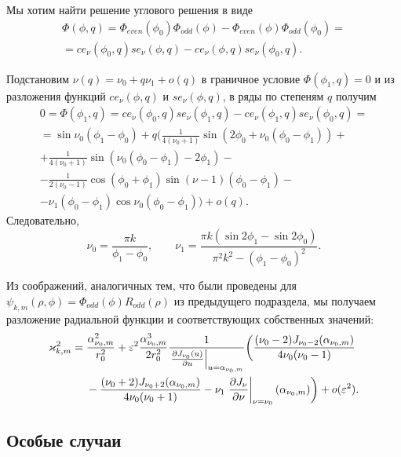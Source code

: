 Мы хотим найти решение углового решения в виде
\begin{multline*}
\Phi(\phi, q) = \Phi_{even}(\phi_0) \Phi_{odd}(\phi) - \Phi_{even}(\phi) \Phi_{odd}(\phi_0)  = \\
=ce_\nu(\phi_0, q) se_\nu(\phi, q) - ce_\nu(\phi, q) se_\nu(\phi_0, q).
\end{multline*}

 
Подстановим $\nu(q) = \nu_0 + q \nu_1 + o(q)$
в граничное условие  $\Phi(\phi_1, q) = 0$
и из разложения функций $ce_\nu(\phi, q)$ и $se_\nu(\phi, q)$, в ряды по степеням  $q$
 получим
\begin{multline*}
0=\Phi(\phi_1, q) = ce_\nu(\phi_0, q) se_\nu(\phi_1, q) -ce_\nu(\phi_1, q) se_\nu(\phi_0, q) = \\
= \sin \nu_0 (\phi_1 - \phi_0) +q \biggl(
\frac{1}{4(\nu_0+1)}  \sin{(2 \phi_0 + \nu_0(\phi_0-\phi_1))}+  \\
+\frac{1}{4(\nu_0+1)} \sin{(\nu_0(\phi_0-\phi_1)-2\phi_1)} - \\
-\frac{1}{2(\nu_0-1)}\cos{(\phi_0 + \phi_1)}\sin{(\nu-1)(\phi_0-\phi_1)} -\\
- \nu_1 (\phi_0 - \phi_1) \cos{\nu_0(\phi_0-\phi_1)} \biggr) + o(q).
\end{multline*}
Следовательно, 
\begin{equation*}
    \nu_0 = \frac{\pi k}{\phi_1-\phi_0}, \qquad \nu_1 = \frac{\pi k (\sin 2\phi_1 - \sin 2 \phi_0)}{\pi^2k^2-(\phi_1-\phi_0)^2}.
\end{equation*}

Из соображений, аналогичных тем, что были проведены для  $\psi_{k, m}(\rho, \phi) = \Phi_{odd}(\phi) R_{odd}(\rho)$ из предыдущего подраздела,
мы получаем разложение радиальной функции и соответствующих собственных значений:
\begin{align*}
    \varkappa_{k, m}^2 ={}& \frac{\alpha_{\nu_0, m}^2}{r_0^2} +  \varepsilon^2 \frac{\alpha_{\nu_0, m}^3}{2 r_0^2}\frac{1}{ \left.\frac{\partial J_{\nu_0}(u)}{\partial u}\right|_{u=\alpha_{\nu_0, m}} }\biggl(\frac{(\nu_0 - 2)J_{\nu_0-2}(\alpha_{\nu_0, m})   }{4\nu_0 (\nu_0-1)} \notag \\
&{}- \frac{(\nu_0 + 2)J_{\nu_0+2}(\alpha_{\nu_0, m})}{4\nu_0 (\nu_0+1)}  - \nu_1 \left.\frac{\partial J_\nu}{\partial \nu}\right|_{\nu = \nu_0}(\alpha_{\nu_0, m})
    \biggr) + o(\varepsilon^2).
\end{align*}

\subsection{Особые случаи}\label{sec:ch2/sec2/sub3}
